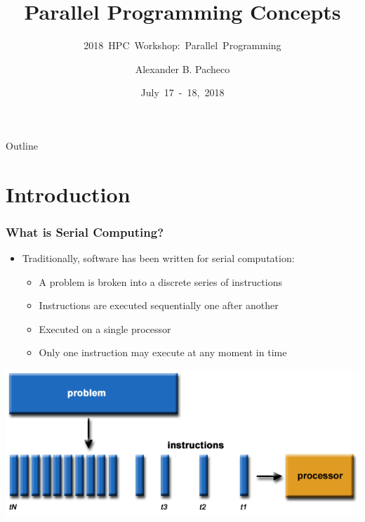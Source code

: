 \documentclass[10pt,t]{beamer}
\title{Parallel Programming Concepts}
\subtitle{2018~HPC~Workshop:~Parallel~Programming}
\author{Alexander B. Pacheco}
\institute{\href{http://researchcomputing.lehigh.edu}{Research~Computing}}
\date{July~17~-~18,~2018}
\begin{document}
\begin{frame}
  \titlepage
\end{frame}

\begin{frame}[c]{Outline}
  \tableofcontents
\end{frame}

\scriptsize
\section{Introduction}
\begin{frame}
  \frametitle{What is Serial Computing?}
  \begin{itemize}
  \item Traditionally, software has been written for serial computation:
    \begin{itemize}
    \item A problem is broken into a discrete series of instructions
    \item Instructions are executed sequentially one after another
    \item Executed on a single processor
    \item Only one instruction may execute at any moment in time
    \end{itemize}
  \end{itemize}
  \includegraphics[width=\textwidth]{./serialProblem}
\end{frame}
\end{document}
